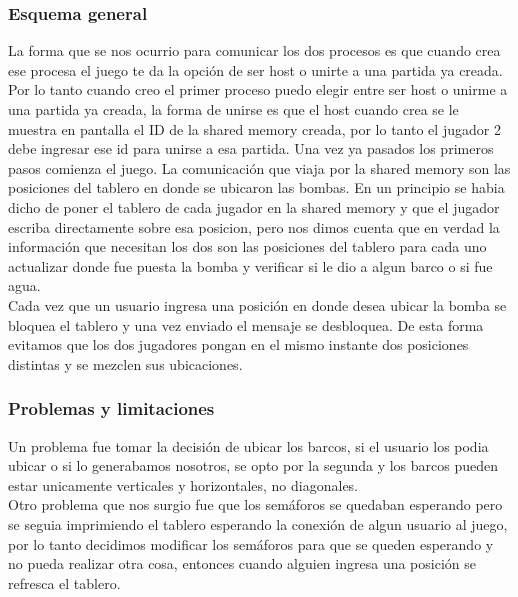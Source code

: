 \documentclass[10pt,a4paper]{article}
\begin{document}
	\subsubsection{Esquema general}
		La forma que se nos ocurrio para comunicar los dos procesos es que cuando crea ese procesa el juego te da la opci\'on de ser host o unirte a una partida ya creada. Por lo tanto cuando creo el primer proceso puedo elegir entre ser host o unirme a una partida ya creada, la forma de unirse es que el host cuando crea se le muestra en pantalla el ID de la shared memory creada, por lo tanto el jugador 2 debe ingresar ese id para unirse a esa partida. Una vez ya pasados los primeros pasos comienza el juego. La comunicaci\'on que viaja por la shared memory son las posiciones del tablero en donde se ubicaron las bombas. En un principio se habia dicho de poner el tablero de cada jugador en la shared memory y que el jugador escriba directamente sobre esa posicion, pero nos dimos cuenta que en verdad la informaci\'on que necesitan los dos son las posiciones del tablero para cada uno actualizar donde fue puesta la bomba y verificar si le dio a algun barco o si fue agua. \\
		Cada vez que un usuario ingresa una posici\'on en donde desea ubicar la bomba se bloquea el tablero y una vez enviado el mensaje se desbloquea. De esta forma evitamos que los dos jugadores pongan en el mismo instante dos posiciones distintas y se mezclen sus ubicaciones.
	\subsubsection{Problemas y limitaciones}
		Un problema fue tomar la decisi\'on de ubicar los barcos, si el usuario los podia ubicar o si lo generabamos nosotros, se opto por la segunda y los barcos pueden estar unicamente verticales y horizontales, no diagonales. \\
		Otro problema que nos surgio fue que los sem\'aforos se quedaban esperando pero se seguia imprimiendo el tablero esperando la conexi\'on de algun usuario al juego, por lo tanto decidimos modificar los sem\'aforos para que se queden esperando y no pueda realizar otra cosa, entonces cuando alguien ingresa una posici\'on se refresca el tablero.  
\end{document}
